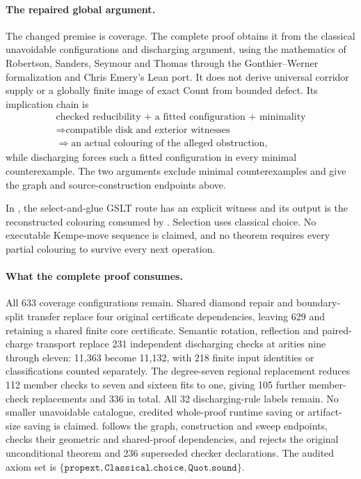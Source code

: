 \paragraph{The repaired global argument.}
The changed premise is coverage. The complete proof obtains it from the
classical unavoidable configurations and discharging argument, using the
mathematics of Robertson, Sanders, Seymour and Thomas through the
Gonthier--Werner formalization and Chris Emery's Lean port. It does not derive
universal corridor supply or a globally finite image of exact Count from
bounded defect. Its implication chain is
\[
\begin{gathered}
\text{checked reducibility + a fitted configuration + minimality}\\
\Longrightarrow\text{compatible disk and exterior witnesses}\\
\Longrightarrow\text{an actual colouring of the alleged obstruction},
\end{gathered}
\]
while discharging forces such a fitted configuration in every minimal
counterexample. The two arguments exclude minimal counterexamples and give
the graph and source-construction endpoints above.

In , the select-and-glue GSLT route has an
explicit witness and its output is the reconstructed colouring consumed by
. Selection uses classical
choice. No executable Kempe-move sequence is claimed, and no theorem requires
every partial colouring to survive every next operation.

\paragraph{What the complete proof consumes.}
All 633 coverage configurations remain. Shared diamond repair and
boundary-split transfer replace four original certificate dependencies,
leaving 629 and retaining a shared finite core certificate. Semantic
rotation, reflection and paired-charge transport replace 231 independent
discharging checks at arities nine through eleven: 11,363 become 11,132,
with 218 finite input identities or classifications counted separately.
The degree-seven regional replacement reduces 112 member checks to seven
and sixteen fits to one, giving 105 further member-check replacements and
336 in total. All 32 discharging-rule labels remain. No smaller unavoidable
catalogue, credited whole-proof runtime saving or artifact-size saving is
claimed.
 follows the graph, construction and
sweep endpoints, checks their geometric and shared-proof dependencies, and
rejects the original unconditional theorem and 236 superseded checker
declarations. The audited axiom set is
\(\{\texttt{propext},\texttt{Classical.choice},\texttt{Quot.sound}\}\).

